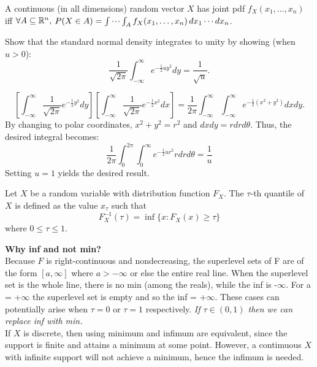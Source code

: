 \documentclass[DIV=14,titlepage=false]{scrreprt}
\begin{document}
A continuous (in all dimensions) random vector $ X $ has joint pdf $ f_X(x_1, \dotsc, x_n) $ iff $ \forall A \subseteq \mathbb{R}^n, $ $ P(X \in A) = \idotsint_A f_X(x_1, \dotsc, x_n) \, dx_1 \dotsm dx_n $.
\vspace{5pt}
\begin{exercise}
  Show that the standard normal density integrates to unity by showing (when \( u > 0 \)):
  \[
\frac{1}{\sqrt{2\pi}} \int_{-\infty}^{\infty} e^{-\frac{1}{2}u y^2} dy = \frac{1}{\sqrt{u}}.
\]
\end{exercise}
\begin{solution}
\[\left[
\int_{-\infty}^{\infty} \frac{1}{\sqrt{2\pi}} e^{-\frac{1}{2}y^2} dy
\right]
\left[
\int_{-\infty}^{\infty} \frac{1}{\sqrt{2\pi}} e^{-\frac{1}{2}x^2} dx
\right] 
= \frac{1}{2\pi} \int_{-\infty}^{\infty} \int_{-\infty}^{\infty} e^{-\frac{1}{2}(x^2+y^2)} dxdy.
\]
By changing to polar coordinates, $x^2+y^2=r^2$ and $dxdy=rdrd\theta$. Thus, the desired integral becomes:
\[ \frac{1}{2\pi} \int_{0}^{2\pi} \int_{0}^{\infty} e^{-\frac{1}{2}ur^2} rdrd\theta = \frac{1}{u}\]
Setting $u=1$ yields the desired result.
\end{solution}
\begin{definition}
  Let \( X \) be a random variable with distribution function \( F_X \). The \(\tau\)-th quantile of \( X \) is defined as the value \( x_\tau \) such that
\[ F_X^{-1}(\tau) = \inf\{ x : F_X(x) \geq \tau \} \]
where \( 0 \leq \tau \leq 1 \).
\end{definition}
\vspace{5pt}
\textbf{Why inf and not min?}\\
Because $F$ is right-continuous and nondecreasing, the superlevel sets of F are of the form $[a,\infty]$ where $a>-\infty$ or else the entire real line. When the superlevel set is the whole line, there is no min (among the reals), while the inf is -$ \infty$. For a = +$ \infty$ the superlevel set is empty and so the inf = +$\infty$. These cases can potentially arise when $\tau=0$ or $\tau = 1$ respectively.
\textit{If $\tau \in (0,1)$ then we can replace inf with min.}\\
If $X$ is discrete, then using minimum and infimum are equivalent, since the support is finite and attains a minimum at some point. However, a contimuous $X$ with infinite support will not achieve a minimum, hence the infimum is needed.
\end{document}
